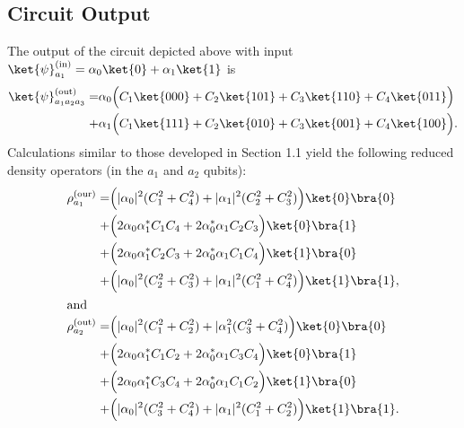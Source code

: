 \documentclass[reqno]{amsart}
\numberwithin{lemma}{section}
\numberwithin{proposition}{section}
\begin{document}
\subsection{Circuit Output} 
The output of the circuit depicted above with input $\ket{\psi}^{\textnormal{(in)}}_{a_{1}}  = \alpha_{0} \ket{0} + \alpha_{1} \ket{1}$ is
\begin{align*}
	\ket{\psi}^{\textnormal{(out)}}_{a_{1}a_{2}a_{3}} = &\alpha_{0} \Big ( C_{1} \ket{000} + C_{2} \ket{101} + C_{3} \ket{110} + C_{4} \ket{011}  \Big ) \\
	 + & \alpha_{1} \Big ( C_{1} \ket{111} + C_{2} \ket{010} + C_{3} \ket{001} + C_{4} \ket{100} \Big ). 
\end{align*}
Calculations similar to those developed in Section 1.1 yield the following reduced density operators (in the $a_{1}$ and $a_{2}$ qubits):
\begin{align*}
	\rho_{a_{1}}^{\textnormal{(our)}} = &\Big ( \vert \alpha_{0} \vert^{2} (C_{1}^{2} + C_{4}^{2}) + \vert \alpha_{1} \vert^{2} (C_{2}^{2} + C_{3}^{2})\Big ) \ket{0}\bra{0} \\
	+ & \Big ( 2 \alpha_{0} \alpha_{1}^{*} C_{1}C_{4} + 2 \alpha_{0}^{*} \alpha_{1} C_{2} C_{3} \Big ) \ket{0}\bra{1}\\
	+ & \Big ( 2 \alpha_{0} \alpha_{1}^{*} C_{2} C_{3} + 2 \alpha_{0}^{*} \alpha_{1} C_{1} C_{4} \Big ) \ket{1}\bra{0}\\
	+ & \Big ( \vert \alpha_{0} \vert^{2} (C_{2}^{2} + C_{3}^{2}) + \vert \alpha_{1} \vert^{2} (C_{1}^{2} + C_{4}^{2}) \Big ) \ket{1}\bra{1},\\
	\intertext{and}
	\rho_{a_{2}}^{\textnormal{(out)}} = &\Big ( \vert \alpha_{0} \vert^{2} (C_{1}^{2} + C_{2}^{2}) + \vert \alpha_{1}^{2} (C_{3}^{2} + C_{4}^{2}) \Big ) \ket{0}\bra{0} \\
	+ & \Big ( 2 \alpha_{0} \alpha_{1}^{*} C_{1} C_{2} + 2 \alpha_{0}^{*} \alpha_{1} C_{3} C_{4} \Big ) \ket{0}\bra{1}\\
	+ & \Big ( 2 \alpha_{0} \alpha_{1}^{*} C_{3} C_{4} + 2 \alpha_{0}^{*} \alpha_{1} C_{1} C_{2} \Big ) \ket{1}\bra{0}\\
	+ & \Big ( \vert \alpha_{0} \vert^{2} (C_{3}^{2} + C_{4}^{2}) + \vert \alpha_{1} \vert^{2} ( C_{1}^{2} + C_{2}^{2}) \Big ) \ket{1}\bra{1}.\\
\end{align*}








\end{document}
